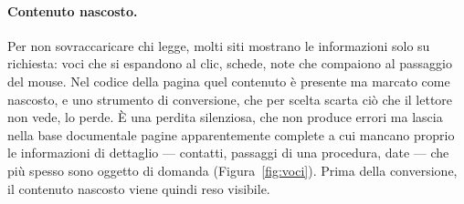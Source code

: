 \paragraph{Contenuto nascosto.} Per non sovraccaricare chi legge, molti siti mostrano le informazioni solo su
richiesta: voci che si espandono al clic, schede, note che compaiono al passaggio del mouse. Nel codice della pagina
quel contenuto è presente ma marcato come nascosto, e uno strumento di conversione, che per scelta scarta ciò che
il lettore non vede, lo perde. È una perdita silenziosa, che non produce errori ma lascia nella base documentale
pagine apparentemente complete a cui mancano proprio le informazioni di dettaglio --- contatti, passaggi di una
procedura, date --- che più spesso sono oggetto di domanda (Figura~\ref{fig:voci}). Prima della conversione,
il contenuto nascosto viene quindi reso visibile.

